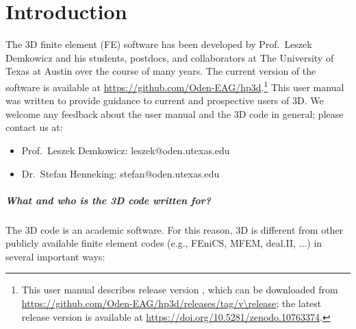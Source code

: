 %
%

\chapter{Introduction}
\label{chap:introduction}



The \hp3D finite element (FE) software has been developed by Prof.~Leszek Demkowicz and his students, postdocs, and collaborators at The University of Texas at Austin over the course of many years. The current version of the software is available at \url{https://github.com/Oden-EAG/hp3d}.\footnote{This user manual describes release version \release, which can be downloaded from \url{https://github.com/Oden-EAG/hp3d/releases/tag/v\release}; the latest release version is available at \url{https://doi.org/10.5281/zenodo.10763374}.} This user manual was written to provide guidance to current and prospective users of \hp3D. We welcome any feedback about the user manual and the \hp3D code in general; please contact us at:
\begin{itemize}
	\item Prof.~Leszek Demkowicz: leszek@oden.utexas.edu
	\item Dr.~Stefan Henneking: stefan@oden.utexas.edu
\end{itemize}

\paragraph{What and who is the \hp3D code written for?}
The \hp3D code is an academic software. For this reason, \hp3D is different from other publicly available finite element codes (e.g., FEniCS, MFEM, deal.II, ...) in several important ways:


